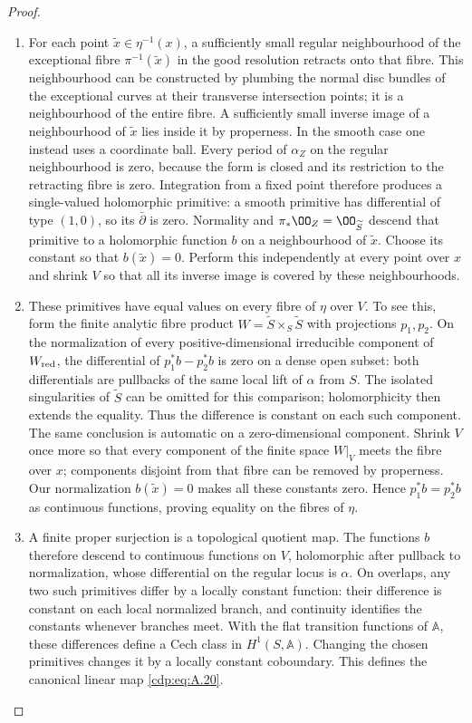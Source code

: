 \begin{proof}
\begin{enumerate}[label={$\langle1\rangle$\arabic*.},leftmargin=*]
\item For each point $\widetilde x\in\eta^{-1}(x)$, a sufficiently small regular neighbourhood of the exceptional fibre $\pi^{-1}(\widetilde x)$ in the good resolution retracts onto that fibre. This neighbourhood can be constructed by plumbing the normal disc bundles of the exceptional curves at their transverse intersection points; it is a neighbourhood of the entire fibre. A sufficiently small inverse image of a neighbourhood of $\widetilde x$ lies inside it by properness. In the smooth case one instead uses a coordinate ball. Every period of $\alpha_Z$ on the regular neighbourhood is zero, because the form is closed and its restriction to the retracting fibre is zero. Integration from a fixed point therefore produces a single-valued holomorphic primitive: a smooth primitive has differential of type $(1,0)$, so its $\bar\partial$ is zero. Normality and $\pi_*\OO_Z=\OO_{\widetilde S}$ descend that primitive to a holomorphic function $b$ on a neighbourhood of $\widetilde x$. Choose its constant so that $b(\widetilde x)=0$. Perform this independently at every point over $x$ and shrink $V$ so that all its inverse image is covered by these neighbourhoods.

\item These primitives have equal values on every fibre of $\eta$ over $V$. To see this, form the finite analytic fibre product
$W=\widetilde S\times_S\widetilde S$ with projections $p_1,p_2$. On the normalization of every positive-dimensional irreducible component of $W_{\rm red}$, the differential of $p_1^*b-p_2^*b$ is zero on a dense open subset: both differentials are pullbacks of the same local lift of $\alpha$ from $S$. The isolated singularities of $\widetilde S$ can be omitted for this comparison; holomorphicity then extends the equality. Thus the difference is constant on each such component. The same conclusion is automatic on a zero-dimensional component. Shrink $V$ once more so that every component of the finite space $W|_V$ meets the fibre over $x$; components disjoint from that fibre can be removed by properness. Our normalization $b(\widetilde x)=0$ makes all these constants zero. Hence $p_1^*b=p_2^*b$ as continuous functions, proving equality on the fibres of $\eta$.

\item A finite proper surjection is a topological quotient map. The functions $b$ therefore descend to continuous functions on $V$, holomorphic after pullback to normalization, whose differential on the regular locus is $\alpha$. On overlaps, any two such primitives differ by a locally constant function: their difference is constant on each local normalized branch, and continuity identifies the constants whenever branches meet. With the flat transition functions of $\mathbb A$, these differences define a Cech class in $H^1(S,\mathbb A)$. Changing the chosen primitives changes it by a locally constant coboundary. This defines the canonical linear map \eqref{cdp:eq:A.20}.


\end{enumerate}
\end{proof}
